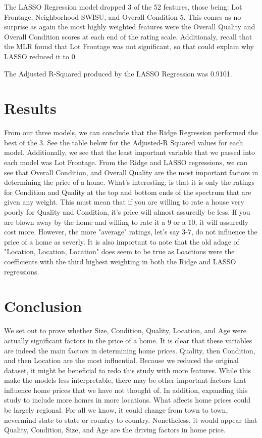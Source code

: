 \documentclass{article}
\begin{document}
	The LASSO Regression model dropped 3 of the 52 features, those being: Lot Frontage, Neighborhood SWISU, and Overall Condition 5. This comes as no surprise as again the most highly weighted features were the Overall Quality and Overall Condition scores at each end of the rating scale. Additionaly, recall that the MLR found that Lot Frontage was not significant, so that could explain why LASSO reduced it to 0.

	The Adjusted R-Squared produced by the LASSO Regression was 0.9101.
	
	
	\section{Results}
	
	From our three models, we can conclude that the Ridge Regression performed the best of the 3. See the table below for the Adjusted-R Squared values for each model. Additionally, we see that the least important variable that we passed into each model was Lot Frontage.
	From the Ridge and LASSO regressions, we can see that Overall Condition, and Overall Quality are the most important factors in determining the price of a home. What's interesting, is that it is only the ratings for Condition and Quality at the top and bottom ends of the spectrum that are given any weight. This must mean that if you are willing to rate a house very poorly for Quality and Condition, it's price will almost assuredly be less. If you are blown away by the home and willing to rate it a 9 or a 10, it will assuredly cost more. However, the more "average" ratings, let's say 3-7, do not influence the price of a home as severly. It is also important to note that the old adage of "Location, Location, Location" does seem to be true as Loactions were the coefficients with the third highest weighting in both the Ridge and LASSO regressions. 
	
	
	\section{Conclusion}

	We set out to prove whether Size, Condition, Quality, Location, and Age were actually significant factors in the price of a home. It is clear that these variables are indeed the main factors in determining home prices. Quality, then Condition, and then Location are the most influential. Because we reduced the original dataset, it might be beneficial to redo this study with more features. While this make the models less interpretable, there may be other important factors that influence home prices that we have not thought of. In addition, expanding this study to include more homes in more locations. What affects home prices could be largely regional. For all we know, it could change from town to town, nevermind state to state or country to country. Nonetheless, it would appear that Quality, Condition, Size, and Age are the driving factors in home price. 
	
	
\end{document}
